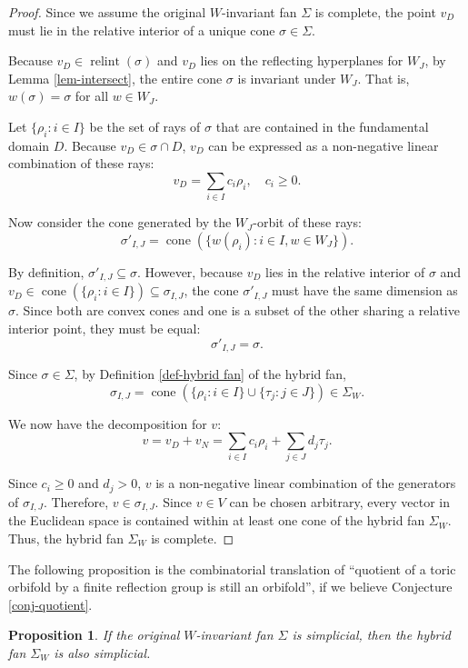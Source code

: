 \documentclass{amsart}
\newtheorem{proposition}[theorem]{Proposition}
\theoremstyle{definition}
\theoremstyle{remark}
\numberwithin{equation}{section}
\begin{document}
\begin{proof}
Since we assume the original $W$-invariant fan $\Sigma$ is complete, the point $v_D$ must lie in the relative interior of a unique cone $\sigma \in \Sigma$.

Because $v_D \in \operatorname{relint}(\sigma)$ and $v_D$ lies on the reflecting hyperplanes for $W_J$, by Lemma \ref{lem-intersect}, the entire cone $\sigma$ is invariant under $W_J$. That is, $w(\sigma) = \sigma$ for all $w \in W_J$.

Let $\{\rho_i : i \in I\}$ be the set of rays of $\sigma$ that are contained in the fundamental domain $D$. Because $v_D \in \sigma \cap D$, $v_D$ can be expressed as a non-negative linear combination of these rays:
$$v_D = \sum_{i \in I} c_i \rho_i, \quad c_i \geq 0.$$

Now consider the cone generated by the $W_J$-orbit of these rays:
$$\sigma'_{I,J} = \operatorname{cone}(\{ w(\rho_i) : i \in I, w \in W_J \}).$$

By definition, $\sigma'_{I,J} \subseteq \sigma$. However, because $v_D$ lies in the relative interior of $\sigma$ and $v_D \in \operatorname{cone}(\{\rho_i : i \in I\}) \subseteq \sigma_{I,J}$, the cone $\sigma'_{I,J}$ must have the same dimension as $\sigma$. Since both are convex cones and one is a subset of the other sharing a relative interior point, they must be equal:
$$\sigma'_{I,J} = \sigma.$$

Since $\sigma \in \Sigma$, by Definition \ref{def-hybrid fan} of the hybrid fan, 
$$\sigma_{I,J} = \operatorname{cone}(\{\rho_i : i \in I\} \cup \{\tau_j : j \in J\}) \in \Sigma_W.$$

We now have the decomposition for $v$:
$$v = v_D + v_N = \sum_{i \in I} c_i \rho_i + \sum_{j \in J} d_j \tau_j.$$

Since $c_i \geq 0$ and $d_j > 0$, $v$ is a non-negative linear combination of the generators of $\sigma_{I,J}$. 
Therefore, $v \in \sigma_{I,J}$. Since $v \in V$ can be chosen arbitrary, every vector in the Euclidean space is contained within at least one cone of the hybrid fan $\Sigma_W$. 
Thus, the hybrid fan $\Sigma_W$ is complete.
\end{proof}

The following proposition is the combinatorial translation of ``quotient of a toric orbifold by a finite reflection group is still an orbifold'', if we believe Conjecture \ref{conj-quotient}.
\begin{proposition} \label{prop-simplicial}
If the original $W$-invariant fan $\Sigma$ is simplicial, then the hybrid fan $\Sigma_W$ is also simplicial.
\end{proposition}
\end{document}
